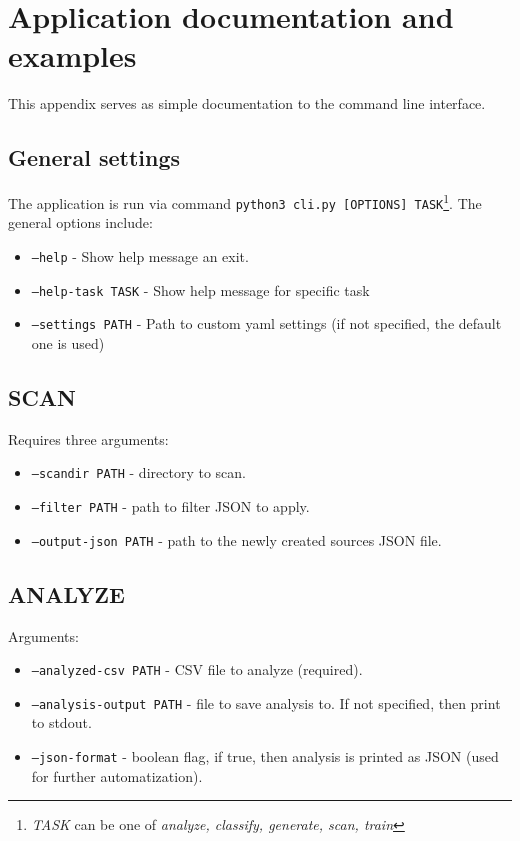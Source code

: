 \chapter{Application documentation and examples}

\label{appendix-running}

This appendix serves as simple documentation to the command line interface. 

\section{General settings}

The application is run via command \texttt{python3 cli.py [OPTIONS] TASK}\footnote{\textit{TASK} can be one of \textit{analyze, classify, generate, scan, train}}. The general options include:

\begin{itemize}

\item \texttt{--help} - Show help message an exit.
\item \texttt{--help-task TASK} - Show help message for specific task
\item \texttt{--settings PATH} - Path to custom yaml settings (if not specified, the default one is used)

\end{itemize}

\section{SCAN}

\noindent
Requires three arguments:

\begin{itemize}

\item \texttt{--scandir PATH} - directory to scan.
\item \texttt{--filter PATH} - path to filter JSON to apply.
\item \texttt{--output-json PATH} - path to the newly created sources JSON file.

\end{itemize}

\section{ANALYZE}

\noindent
Arguments:

\begin{itemize}

\item \texttt{--analyzed-csv PATH} - CSV file to analyze (required).
\item \texttt{--analysis-output PATH} - file to save analysis to. If not specified, then print to stdout.
\item \texttt{--json-format} - boolean flag, if true, then analysis is printed as JSON (used for further automatization).

\end{itemize}

